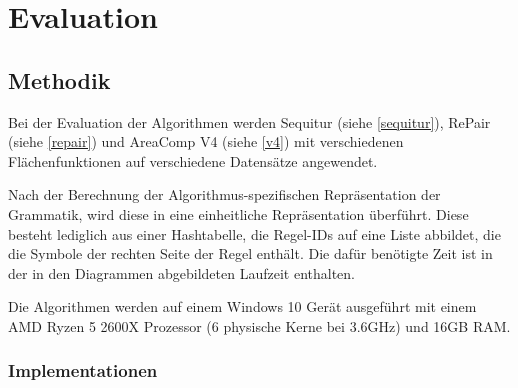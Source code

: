 


\chapter{Evaluation}

\section{Methodik}

Bei der Evaluation der Algorithmen werden Sequitur (siehe \autoref{sequitur}), RePair (siehe \autoref{repair}) und AreaComp V4 (siehe \autoref{v4}) mit verschiedenen Flächenfunktionen auf verschiedene Datensätze angewendet. 

Nach der Berechnung der Algorithmus-spezifischen Repräsentation der Grammatik, wird diese in eine einheitliche Repräsentation überführt. Diese besteht lediglich aus einer Hashtabelle, die Regel-IDs auf eine Liste abbildet, die die Symbole der rechten Seite der Regel enthält. Die dafür benötigte Zeit ist in der in den Diagrammen abgebildeten Laufzeit enthalten.

Die Algorithmen werden auf einem Windows 10 Gerät ausgeführt mit einem AMD Ryzen 5 2600X Prozessor (6 physische Kerne bei 3.6GHz) und 16GB RAM.

\subsection{Implementationen}


